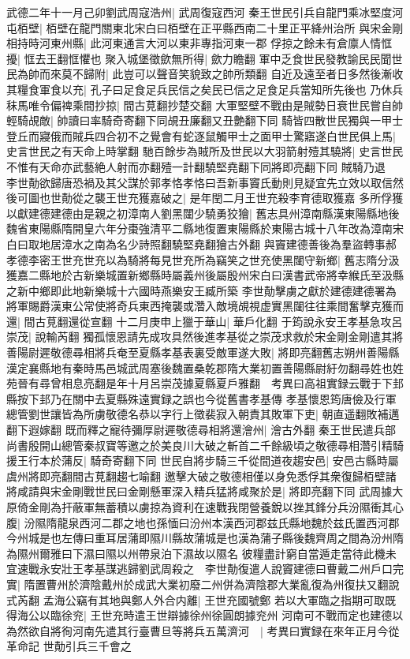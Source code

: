 武德二年十一月己卯劉武周寇浩州|{
	武周復寇西河}
秦王世民引兵自龍門乘冰堅度河屯栢壁|{
	栢壁在龍門關東北宋白曰栢壁在正平縣西南二十里正平絳州治所}
與宋金剛相持時河東州縣|{
	此河東通言大河以東非專指河東一郡}
俘掠之餘未有倉廪人情恇擾|{
	恇去王翻恇懼也}
聚入城堡徵歛無所得|{
	歛力瞻翻}
軍中乏食世民發教諭民民聞世民為帥而來莫不歸附|{
	此豈可以聲音笑貌致之帥所類翻}
自近及遠至者日多然後漸收其糧食軍食以充|{
	孔子曰足食足兵民信之矣民已信之足食足兵當知所先後也}
乃休兵秣馬唯令偏禆乘間抄掠|{
	間古莧翻抄楚交翻}
大軍堅壁不戰由是賊勢日衰世民嘗自帥輕騎覘敵|{
	帥讀曰率騎奇寄翻下同覘丑廉翻又丑艶翻下同}
騎皆四散世民獨與一甲士登丘而寢俄而賊兵四合初不之覺會有蛇逐鼠觸甲士之面甲士驚寤遂白世民俱上馬|{
	史言世民之有天命上時掌翻}
馳百餘步為賊所及世民以大羽箭射殪其驍將|{
	史言世民不惟有天命亦武藝絶人射而亦翻殪一計翻驍堅堯翻下同將即亮翻下同}
賊騎乃退　李世勣欲歸唐恐禍及其父謀於郭孝恪孝恪曰吾新事竇氏動則見疑宜先立效以取信然後可圖也世勣從之襲王世充獲嘉破之|{
	是年閏二月王世充殺李育德取獲嘉}
多所俘獲以獻建德建德由是親之初漳南人劉黑闥少驍勇狡獪|{
	舊志具州漳南縣漢東陽縣地後魏省東陽縣隋開皇六年分棗強清平二縣地復置東陽縣於東陽古城十八年改為漳南宋白曰取地居漳水之南為名少詩照翻驍堅堯翻獪古外翻}
與竇建德善後為羣盜轉事郝孝德李密王世充世充以為騎將每見世充所為竊笑之世充使黑闥守新鄉|{
	舊志隋分汲獲嘉二縣地於古新樂城置新鄉縣時屬義州後屬殷州宋白曰漢書武帝將幸緱氏至汲縣之新中鄉即此地新樂城十六國時燕樂安王臧所築}
李世勣擊虜之獻於建德建德署為將軍賜爵漢東公常使將奇兵東西掩襲或濳入敵境覘視虚實黑闥往往乘間奮擊克獲而還|{
	間古莧翻還從宣翻}
十二月庚申上獵于華山|{
	華戶化翻}
于筠說永安王孝基急攻呂崇茂|{
	說輸芮翻}
獨孤懷恩請先成攻具然後進孝基從之崇茂求救於宋金剛金剛遣其將善陽尉遲敬德尋相將兵奄至夏縣孝基表裏受敵軍遂大敗|{
	將即亮翻舊志朔州善陽縣漢定襄縣地有秦時馬邑城武周塞後魏置桑乾郡隋大業初置善陽縣尉紆勿翻尋姓也姓苑晉有尋曾相息亮翻是年十月呂崇茂據夏縣夏戶雅翻　考異曰高祖實録云戰于下邽縣按下邽乃在關中去夏縣殊遠實録之誤也今從舊書孝基傳}
孝基懷恩筠唐儉及行軍總管劉世讓皆為所虜敬德名恭以字行上徵裴寂入朝責其敗軍下吏|{
	朝直遥翻敗補邁翻下遐嫁翻}
既而釋之寵待彌厚尉遲敬德尋相將還澮州|{
	澮古外翻}
秦王世民遣兵部尚書殷開山總管秦叔寶等邀之於美良川大破之斬首二千餘級頃之敬德尋相濳引精騎援王行本於蒲反|{
	騎奇寄翻下同}
世民自將步騎三千從間道夜趨安邑|{
	安邑古縣時屬虞州將即亮翻間古莧翻趨七喻翻}
邀擊大破之敬德相僅以身免悉俘其衆復歸栢壁諸將咸請與宋金剛戰世民曰金剛懸軍深入精兵猛將咸聚於是|{
	將即亮翻下同}
武周據大原倚金剛為扞蔽軍無蓄積以虜掠為資利在速戰我閉營養銳以挫其鋒分兵汾隰衝其心腹|{
	汾隰隋龍泉西河二郡之地也孫愐曰汾州本漢西河郡兹氏縣地魏於兹氏置西河郡今州城是也左傳曰重耳居蒲即隰川縣故蒲城是也漢為蒲子縣後魏齊周之間為汾州隋為隰州爾雅曰下濕曰隰以州帶泉泊下濕故以隰名}
彼糧盡計窮自當遁走當待此機未宜速戰永安壯王孝基謀逃歸劉武周殺之　李世勣復遣人說竇建德曰曹戴二州戶口完實|{
	隋置曹州於濟陰戴州於成武大業初廢二州併為濟陰郡大業亂復為州復扶又翻說式芮翻}
孟海公竊有其地與鄭人外合内離|{
	王世充國號鄭}
若以大軍臨之指期可取既得海公以臨徐兖|{
	王世充時遣王世辯據徐州徐圓朗據兖州}
河南可不戰而定也建德以為然欲自將徇河南先遣其行臺曹旦等將兵五萬濟河　|{
	考異曰實録在來年正月今從革命記}
世勣引兵三千會之

